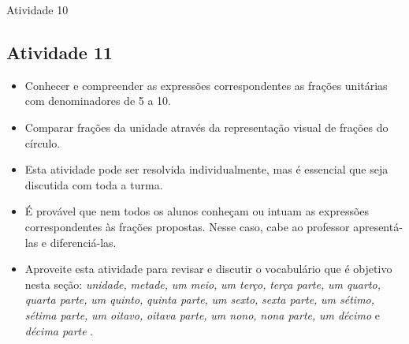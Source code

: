 \begin{multicols}{2}
\begin{resposta*}{Atividade 10}
\end{resposta*}


\subsection{Atividade 11}
   \vspace{.1cm}
  
\begin{itemize} %
    \item       Conhecer e compreender as expressões correspondentes as frações unitárias com denominadores de 5 a 10.
    \item       Comparar frações da unidade através da representação visual de frações do círculo.
\end{itemize} %
 \vspace{.1cm}

   \vspace{.1cm}

  \begin{itemize} %
    \item       Esta atividade pode ser resolvida individualmente, mas é essencial que seja discutida com toda a turma.
    \item       É provável que nem todos os alunos conheçam ou intuam as expressões correspondentes às frações propostas. Nesse caso, cabe ao professor apresentá-las e diferenciá-las.
    \item       Aproveite esta atividade para revisar e discutir o vocabulário que é objetivo nesta seção:       {\it unidade,}             {\it metade,}             {\it um meio,}             {\it um terço,}             {\it terça parte,}             {\it um quarto,}             {\it quarta parte,}             {\it um quinto,}             {\it quinta parte,}             {\it um sexto,}             {\it sexta parte,}             {\it um sétimo,}             {\it sétima parte,}             {\it um oitavo,}             {\it oitava parte,}             {\it um nono,}             {\it nona parte,}             {\it um décimo}       e       {\it décima parte}      .
\end{itemize} %





\end{multicols}
